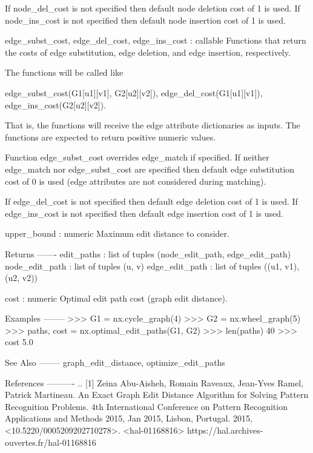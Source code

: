 \begin{DoxyVerb}
    If node_del_cost is not specified then default node deletion
    cost of 1 is used.  If node_ins_cost is not specified then
    default node insertion cost of 1 is used.

edge_subst_cost, edge_del_cost, edge_ins_cost : callable
    Functions that return the costs of edge substitution, edge
    deletion, and edge insertion, respectively.

    The functions will be called like

       edge_subst_cost(G1[u1][v1], G2[u2][v2]),
       edge_del_cost(G1[u1][v1]),
       edge_ins_cost(G2[u2][v2]).

    That is, the functions will receive the edge attribute
    dictionaries as inputs.  The functions are expected to return
    positive numeric values.

    Function edge_subst_cost overrides edge_match if specified.
    If neither edge_match nor edge_subst_cost are specified then
    default edge substitution cost of 0 is used (edge attributes
    are not considered during matching).

    If edge_del_cost is not specified then default edge deletion
    cost of 1 is used.  If edge_ins_cost is not specified then
    default edge insertion cost of 1 is used.

upper_bound : numeric
    Maximum edit distance to consider.

Returns
-------
edit_paths : list of tuples (node_edit_path, edge_edit_path)
    node_edit_path : list of tuples (u, v)
    edge_edit_path : list of tuples ((u1, v1), (u2, v2))

cost : numeric
    Optimal edit path cost (graph edit distance).

Examples
--------
>>> G1 = nx.cycle_graph(4)
>>> G2 = nx.wheel_graph(5)
>>> paths, cost = nx.optimal_edit_paths(G1, G2)
>>> len(paths)
40
>>> cost
5.0

See Also
--------
graph_edit_distance, optimize_edit_paths

References
----------
.. [1] Zeina Abu-Aisheh, Romain Raveaux, Jean-Yves Ramel, Patrick
   Martineau. An Exact Graph Edit Distance Algorithm for Solving
   Pattern Recognition Problems. 4th International Conference on
   Pattern Recognition Applications and Methods 2015, Jan 2015,
   Lisbon, Portugal. 2015,
   <10.5220/0005209202710278>. <hal-01168816>
   https://hal.archives-ouvertes.fr/hal-01168816\end{DoxyVerb}
 \mbox{\label{namespacenetworkx_1_1algorithms_1_1similarity_a07687d73f299d48abf6c9d20b43d1e4f}} 
